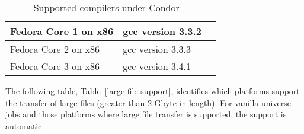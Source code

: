 \begin{center}
\begin{table}[hbt]
\begin{tabular}{|ll|l}
\hline
Fedora Core 1 on x86 & gcc version 3.3.2 \\ 
\hline
Fedora Core 2 on x86 & gcc version 3.3.3 \\ 
\hline
Fedora Core 3 on x86 & gcc version 3.4.1 \\ 
\hline
\end{tabular}
\caption{\label{supported-compile}Supported compilers under Condor \VersionNotice\ }
\end{table}
\end{center}

The following table, 
Table~\ref{large-file-support},
identifies which platforms support
the transfer of large files (greater than 2 Gbyte in length).
For vanilla universe jobs and those platforms where large file transfer is
supported, the support is automatic.

